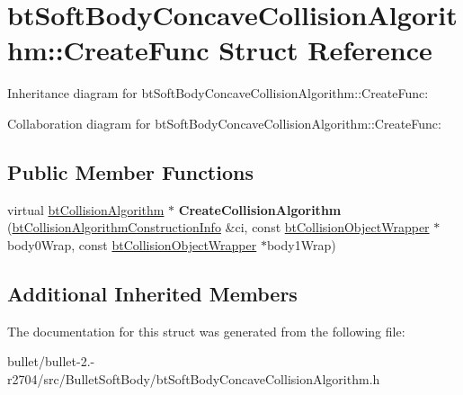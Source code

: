 \hypertarget{structbt_soft_body_concave_collision_algorithm_1_1_create_func}{\section{bt\+Soft\+Body\+Concave\+Collision\+Algorithm\+:\+:Create\+Func Struct Reference}
\label{structbt_soft_body_concave_collision_algorithm_1_1_create_func}
}


Inheritance diagram for bt\+Soft\+Body\+Concave\+Collision\+Algorithm\+:\+:Create\+Func\+:


Collaboration diagram for bt\+Soft\+Body\+Concave\+Collision\+Algorithm\+:\+:Create\+Func\+:
\subsection*{Public Member Functions}
\begin{DoxyCompactItemize}
\item 
\hypertarget{structbt_soft_body_concave_collision_algorithm_1_1_create_func_ab0c4877d1c52995f2634e8a6a3d300db}{virtual \hyperlink{classbt_collision_algorithm}{bt\+Collision\+Algorithm} $\ast$ {\bfseries Create\+Collision\+Algorithm} (\hyperlink{structbt_collision_algorithm_construction_info}{bt\+Collision\+Algorithm\+Construction\+Info} \&ci, const \hyperlink{structbt_collision_object_wrapper}{bt\+Collision\+Object\+Wrapper} $\ast$body0\+Wrap, const \hyperlink{structbt_collision_object_wrapper}{bt\+Collision\+Object\+Wrapper} $\ast$body1\+Wrap)}\label{structbt_soft_body_concave_collision_algorithm_1_1_create_func_ab0c4877d1c52995f2634e8a6a3d300db}

\end{DoxyCompactItemize}
\subsection*{Additional Inherited Members}


The documentation for this struct was generated from the following file\+:\begin{DoxyCompactItemize}
\item 
bullet/bullet-\/2.-\/r2704/src/\+Bullet\+Soft\+Body/bt\+Soft\+Body\+Concave\+Collision\+Algorithm.\+h\end{DoxyCompactItemize}
